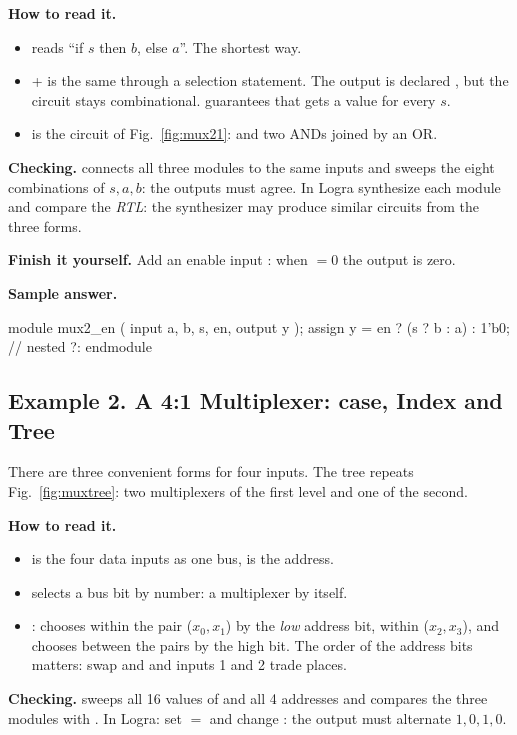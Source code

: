 \textbf{How to read it.}
\begin{itemize}
  \item {} reads ``if $s$ then $b$, else $a$''. The shortest way.
  \item {} +  is the same through a selection statement. The output is declared , but the circuit stays combinational.  guarantees that  gets a value for every $s$.
  \item {} is the circuit of Fig.~\ref{fig:mux21}:  and two ANDs joined by an OR.
\end{itemize}
\textbf{Checking.}  connects all three modules to the same
inputs and sweeps the eight combinations of $s,a,b$: the outputs must agree.
In Logra synthesize each module and compare the \emph{RTL}: the synthesizer
may produce similar circuits from the three forms.

\textbf{Finish it yourself.} Add an enable input : when  $=0$
the output is zero.

\textbf{Sample answer.}
\begin{vcode}
module mux2_en (
    input  a, b, s, en,
    output y
);
    assign y = en ? (s ? b : a) : 1'b0;   // nested ?:
endmodule
\end{vcode}

\subsection{Example 2. A 4:1 Multiplexer: case, Index and Tree}

There are three convenient forms for four inputs. The tree repeats
Fig.~\ref{fig:muxtree}: two multiplexers of the first level and one of the
second.


\textbf{How to read it.}
\begin{itemize}
  \item {} is the four data inputs as one bus,  is the address.
  \item {} selects a bus bit by number: a multiplexer by itself.
  \item {}:  chooses within the pair ($x_0,x_1$) by the \emph{low} address bit,  within ($x_2,x_3$), and  chooses between the pairs by the high bit. The order of the address bits matters: swap  and  and inputs 1 and 2 trade places.
\end{itemize}
\textbf{Checking.}  sweeps all 16 values of  and all 4
addresses and compares the three modules with . In Logra: set
 $=$  and change : the output must alternate
$1,0,1,0$.

